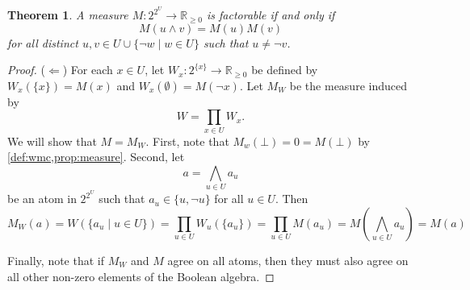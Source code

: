 \documentclass{article}
\newtheorem{theorem}{Theorem}
\theoremstyle{definition}
\theoremstyle{remark}
\begin{document}
\begin{theorem}
  A measure $M\colon 2^{2^U} \to \mathbb{R}_{\ge 0}$ is factorable if and only
  if
  \begin{equation} \label{eq:wmccondition}
  M(u \land v) = M(u)M(v)
  \end{equation}
  for all distinct $u, v \in U \cup \{ \neg w \mid w \in U \}$ such that $u \ne
  \neg v$.
\end{theorem}
\begin{proof}
  ($\Leftarrow$) For each $x \in U$, let $W_x\colon 2^{\{x\}} \to
  \mathbb{R}_{\ge 0}$ be defined by $W_x(\{ x \}) = M(x)$ and $W_x(\emptyset) =
  M(\neg x)$. Let $M_W$ be the measure induced by
  \[
    W = \prod_{x \in U} W_x.
  \]
  We will show that $M = M_W$. First, note that $M_w(\bot) = 0 = M(\bot)$ by
  \cref{def:wmc,prop:measure}. Second, let
  \[
    a = \bigwedge_{u \in U} a_u
  \]
  be an atom in $2^{2^U}$ such that $a_u \in \{ u, \neg u \}$ for all $u \in U$.
  Then
  \[
    M_W(a) = W(\{ a_u \mid u \in U \}) = \prod_{u \in U} W_u(\{a_u\}) = \prod_{u
      \in U} M(a_u) = M \left(\bigwedge_{u \in U} a_u \right) = M(a)
  \]

  Finally, note that if $M_W$ and
  $M$ agree on all atoms, then they must also agree on all other non-zero
  elements of the Boolean algebra.


\end{proof}
\end{document}
